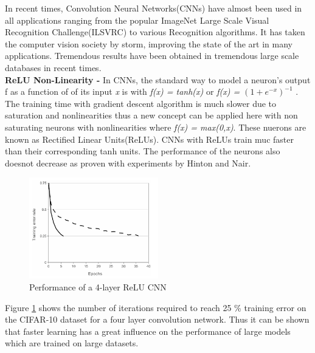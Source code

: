 In recent times, Convolution Neural Networks(CNNs) have almost been used in all applications ranging from the popular ImageNet Large Scale Visual Recognition Challenge(ILSVRC) to various Recognition algorithms. It has taken the computer vision society by storm, improving the state of the art in many applications. Tremendous results have been obtained in tremendous large scale databases in recent times. \\

\textbf{ReLU Non-Linearity - } In CNNs, the standard way to model a neuron's output f as a function of of its input \textit{x} is with \textit{f(x) = tanh(x)} or \textit{f(x) = $(1+e^{-x})^{-1}$} . The training time with gradient descent algorithm is much slower due to saturation and nonlinearities thus a new concept can be applied here with non saturating neurons with nonlinearities where \textit{f(x) = max(0,x)}. These nuerons are known as Rectified Linear Units(ReLUs). CNNs with ReLUs train muc faster than their corresponding tanh units. The performance of the neurons also doesnot decrease as proven with experiments by Hinton and Nair\cite{nair}. 

\begin{figure}
	\begin{center}
		\includegraphics[width=0.5\textwidth]{Figures/Figure21}
	\end{center}
	\caption{Performance of a 4-layer ReLU CNN}
	\label{fig:Figure21}
\end{figure}

Figure \ref{fig:Figure21} \cite{krizhevsky} shows the number of iterations required to reach 25 {\%} training error on the CIFAR-10 dataset for a four layer convolution network. Thus it can be shown that faster learning has a great influence on the performance of large models which are trained on large datasets.

